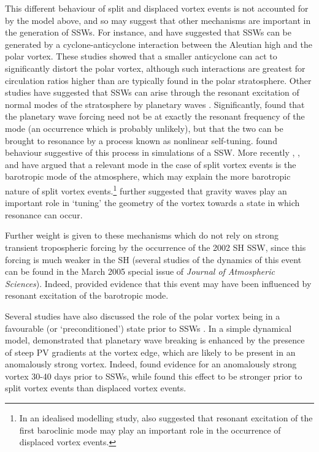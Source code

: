 This different behaviour of split and displaced vortex events is not accounted
for by the \citet{Matsuno1970, Matsuno1971} model above, and so may suggest that
other mechanisms are important in the generation of SSWs. For instance,
\citet{ONeill1988} and \citet{Scott2006} have suggested that SSWs can be
generated by a cyclone-anticyclone interaction between the Aleutian high and the
polar vortex. These studies showed that a smaller anticyclone can act to
significantly distort the polar vortex, although such interactions are greatest
for circulation ratios higher than are typically found in the polar
stratosphere. Other studies have suggested that SSWs can arise through the
resonant excitation of normal modes of the stratosphere by planetary waves
\citep{Tung1979}. Significantly, \citet{Plumb1981} found that the planetary wave
forcing need not be at exactly the resonant frequency of the mode (an occurrence
which is probably unlikely), but that the two can be brought to resonance by a
process known as nonlinear self-tuning. \citet{Smith1989} found behaviour
suggestive of this process in simulations of a SSW. More recently
\citet{Esler2005}, \citet{Esler2006}, and \citet{Matthewman2011} have argued
that a relevant mode in the case of split vortex events is the barotropic mode
of the atmosphere, which may explain the more barotropic nature of split vortex
events.\footnote{In an idealised modelling study, \citet{Esler2011} also
  suggested that resonant excitation of the first baroclinic mode may play an
  important role in the occurrence of displaced vortex events.}
\citet{Albers2014} further suggested that gravity waves play an important role
in `tuning' the geometry of the vortex towards a state in which resonance can
occur.

Further weight is given to these mechanisms which do not rely on strong
transient tropospheric forcing by the occurrence of the 2002 SH SSW, since this
forcing is much weaker in the SH (several studies of the dynamics of this event
can be found in the March 2005 special issue of \emph{Journal of Atmospheric
  Sciences}). Indeed, \citet{Esler2006} provided evidence that this event may
have been influenced by resonant excitation of the barotropic mode.


Several studies have also discussed the role of the polar vortex being in a
favourable (or `preconditioned') state prior to SSWs
\citep[e.g.,][]{McIntyre1982}. In a simple dynamical model, \citet{Scott2004}
demonstrated that planetary wave breaking is enhanced by the presence of steep
PV gradients at the vortex edge, which are likely to be present in an
anomalously strong vortex. Indeed, \citet{Limpasuvan2004} found evidence for an
anomalously strong vortex 30-40 days prior to SSWs, while \citet{Charlton2007}
found this effect to be stronger prior to split vortex events than displaced
vortex events. 

